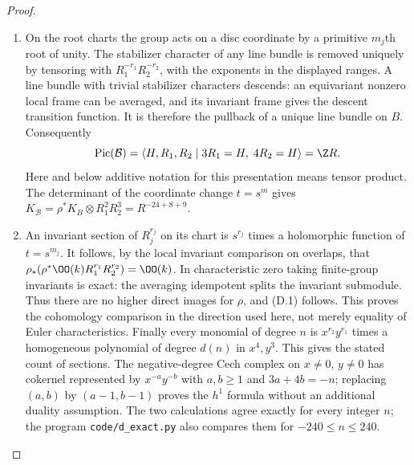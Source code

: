 \begin{proof}
\begin{enumerate}[label=\arabic*.,leftmargin=*]
\item On the root charts the group acts on a disc coordinate by a primitive
$m_j$th root of unity. The stabilizer character of any line bundle is
removed uniquely by tensoring with $R_1^{-r_1}R_2^{-r_2}$, with the
exponents in the displayed ranges. A line bundle with trivial stabilizer
characters descends: an equivariant nonzero local frame can be averaged,
and its invariant frame gives the descent transition function. It is
therefore the pullback of a unique line bundle on $B$. Consequently
\[
 \operatorname{Pic}(\mathcal B)=
 \langle H,R_1,R_2\mid 3R_1=H,\;4R_2=H\rangle=\Z R.
\]
Here and below additive notation for this presentation means tensor
product. The determinant of the coordinate change $t=s^m$ gives
$K_{\mathcal B}=\rho^*K_B\otimes R_1^2R_2^3=R^{-24+8+9}$.

\item An invariant section of $R_j^{r_j}$ on its chart is $s^{r_j}$ times a
holomorphic function of $t=s^{m_j}$. It follows, by the local invariant
comparison on overlaps, that
$\rho_*(\rho^*\OO(k)R_1^{r_1}R_2^{r_2})=\OO(k)$.
In characteristic zero taking finite-group invariants is exact: the
averaging idempotent splits the invariant submodule. Thus there are no
higher direct images for $\rho$, and (D.1) follows. This proves the
cohomology comparison in the direction used here, not merely equality
of Euler characteristics. Finally every monomial of degree $n$ is
$x^{r_2}y^{r_1}$ times a homogeneous polynomial of degree $d(n)$ in
$x^4,y^3$. This gives the stated count of sections. The negative-degree
Cech complex on $x\ne0$, $y\ne0$ has cokernel represented by
$x^{-a}y^{-b}$ with $a,b\ge1$ and $3a+4b=-n$; replacing $(a,b)$ by
$(a-1,b-1)$ proves the $h^1$ formula without an additional duality
assumption. The two calculations agree exactly for every integer $n$;
the program \texttt{code/d\_exact.py} also compares them for
$-240\le n\le240$.
\end{enumerate}
\end{proof}

